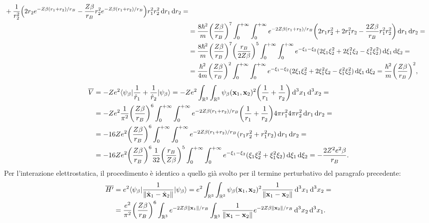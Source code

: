 \begin{equation}
\begin{split}
\begin{multlined}[t]
                +\frac1{r_2^2}\Bigl(2r_2e^{-Z\beta(r_1+r_2)/r_B}-\frac{Z\beta}{r_B}r_2^2e^{-Z\beta(r_1+r_2)/r_B}\Bigr)r_1^2r_2^2\,\dd r_1\,\dd r_2=
        \end{multlined}\\&=
        \frac{8\hbar^2}{m}\biggl(\frac{Z\beta}{r_B}\biggr)^7\int_0^{+\infty}\int_0^{+\infty}e^{-2Z\beta(r_1+r_2)/r_B}\biggl(2r_1r_2^2+2r_1^2r_2-\frac{2Z\beta}{r_B}r_1^2r_2^2\biggr)\,\dd r_1\,\dd r_2=\\&=
        \frac{8\hbar^2}{m}\biggl(\frac{Z\beta}{r_B}\biggr)^7\biggl(\frac{r_B}{2Z\beta}\biggr)^5\int_0^{+\infty}\int_0^{+\infty}e^{-\xi_1-\xi_2}(2\xi_1\xi_2^2+2\xi_1^2\xi_2-\xi_1^2\xi_2^2)\,\dd\xi_1\,\dd\xi_2=\\&=
        \frac{\hbar^2}{4m}\biggl(\frac{Z\beta}{r_B}\biggr)^2\int_0^{+\infty}\int_0^{+\infty}e^{-\xi_1-\xi_2}(2\xi_1\xi_2^2+2\xi_1^2\xi_2-\xi_1^2\xi_2^2)\,\dd\xi_1\,\dd\xi_2=
        \frac{\hbar^2}{m}\biggl(\frac{Z\beta}{r_B}\biggr)^2,
    \end{split}
\end{equation}
\begin{equation}
    \begin{split}
        \overline{V}&=
        -Ze^2\langle\psi_\beta\rvert\frac1{\hat{r}_1}+\frac1{\hat{r}_2}\lvert\psi_\beta\rangle=
        -Ze^2\int_{\mathbb{R}^3}\int_{\mathbb{R}^3}\psi_\beta(\mathbf{x}_1,\mathbf{x}_2)^2\biggl(\frac1{r_1}+\frac1{r_2}\biggr)\,\textup{d}^3 x_1\,\textup{d}^3 x_2=\\&=
        -Ze^2\frac1{\pi^2}\biggl(\frac{Z\beta}{r_B}\biggr)^6\int_0^{+\infty}\int_0^{+\infty}e^{-2Z\beta(r_1+r_2)/r_B}\biggl(\frac1{r_1}+\frac1{r_2}\biggr)4\pi r_1^2 4\pi r_2^2\,\textup{d} r_1\,\textup{d} r_2=\\&=
        -16Ze^2\biggl(\frac{Z\beta}{r_B}\biggr)^6\int_0^{+\infty}\int_0^{+\infty}e^{-2Z\beta(r_1+r_2)/r_B}(r_1r_2^2+r_1^2r_2)\,\textup{d} r_1\,\textup{d} r_2=\\&=
        -16Ze^2\biggl(\frac{Z\beta}{r_B}\biggr)^6\frac1{32}\biggl(\frac{r_B}{Z\beta}\biggr)^5\int_0^{+\infty}\int_0^{+\infty}e^{-\xi_1-\xi_2}(\xi_1\xi_2^2+\xi_1^2\xi_2)\,\textup{d} \xi_1\,\textup{d} \xi_2=-\frac{2Z^2e^2\beta}{r_B}.
    \end{split}
\end{equation}
Per l'interazione elettrostatica, il procedimento è identico a quello già svolto per il termine perturbativo del paragrafo precedente:
\begin{equation}
    \begin{split}
        \overline{H'}&=
        e^2\langle\psi_\beta\rvert\frac1{\lVert\hat{\mathbf{x}}_1-\hat{\mathbf{x}}_2\rVert}\lvert\psi_\beta\rangle=
        e^2\int_{\mathbb{R}^3}\int_{\mathbb{R}^3}\psi_\beta(\mathbf{x}_1,\mathbf{x}_2)^2\frac1{\lVert\mathbf{x}_1-\mathbf{x}_2\rVert}\,\textup{d}^3 x_1\,\textup{d}^3 x_2=\\&=
        \frac{e^2}{\pi^2}\biggl(\frac{Z\beta}{r_B}\biggr)^6\int_{\mathbb{R}^3}e^{-2Z\beta\lVert\mathbf{x}_1\rVert/r_B}\int_{\mathbb{R}^3}\frac1{\lVert\mathbf{x}_1-\mathbf{x}_2\rVert}e^{-2Z\beta\lVert\mathbf{x}_2\rVert/r_B}\,\textup{d}^3 x_2\,\textup{d}^3 x_1.
    \end{split}
\end{equation}
